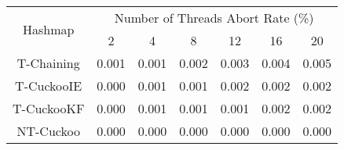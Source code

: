 \begin{tabular}{|c|c|c|c|c|c|c|}
\hline
\multirow{2}{*}{Hashmap} & \multicolumn{6}{c|}{Number of Threads Abort Rate (\%)}\\\cline{2-7}& 2 & 4 & 8 & 12 & 16 & 20\\
\hline
\hline
T-Chaining & 0.001 & 0.001 & 0.002 & 0.003 & 0.004 & 0.005\\
T-CuckooIE & 0.000 & 0.001 & 0.001 & 0.002 & 0.002 & 0.002\\
T-CuckooKF & 0.000 & 0.001 & 0.001 & 0.001 & 0.002 & 0.002\\
NT-Cuckoo & 0.000 & 0.000 & 0.000 & 0.000 & 0.000 & 0.000\\
\hline
\end{tabular}
